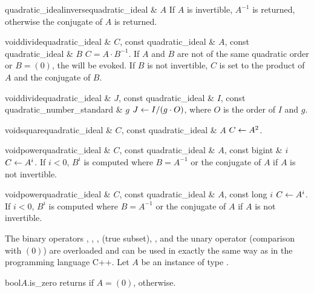 \begin{fcode}{quadratic_ideal}{inverse}{quadratic_ideal & $A$}
  If $A$ is invertible, $A^{-1}$ is returned, otherwise the conjugate of $A$ is returned.
\end{fcode}

\begin{fcode}{void}{divide}{quadratic_ideal & $C$, const quadratic_ideal & $A$, const quadratic_ideal & $B$}
  $C = A \cdot B^{-1}$.  If $A$ and $B$ are not of the same quadratic order or $B = (0)$, the
  \LEH will be evoked.  If $B$ is not invertible, $C$ is set to the product of $A$ and the
  conjugate of $B$.
\end{fcode}

\begin{fcode}{void}{divide}{quadratic_ideal & $J$, const quadratic_ideal & $I$,
    const quadratic_number_standard & $g$}%
  $J \leftarrow I / (g \cdot O)$, where $O$ is the order of $I$ and $g$.
\end{fcode}

\begin{fcode}{void}{square}{quadratic_ideal & $C$, const quadratic_ideal & $A$}
  $C \leftarrow A^2$.
\end{fcode}

\begin{fcode}{void}{power}{quadratic_ideal & $C$, const quadratic_ideal & $A$, const bigint & $i$}
  $C \leftarrow A^i$.  If $i < 0$, $B^i$ is computed where $B = A^{-1}$ or the conjugate of $A$ if $A$ is
  not invertible.
\end{fcode}

\begin{fcode}{void}{power}{quadratic_ideal & $C$, const quadratic_ideal & $A$, const long $i$}
  $C \leftarrow A^i$.  If $i < 0$, $B^i$ is computed where $B = A^{-1}$ or the conjugate of $A$ if
  $A$ is not invertible.
\end{fcode}




\COMP

The binary operators \code{==}, \code{!=}, \code{<=}, \code{<} (true subset), \code{>=},
\code{>} and the unary operator \code{!} (comparison with $(0)$) are overloaded and can be used
in exactly the same way as in the programming language C++.  Let $A$ be an instance of type
.

\begin{cfcode}{bool}{$A$.is_zero}{}
  returns \TRUE if $A = (0)$, \FALSE otherwise.
\end{cfcode}


